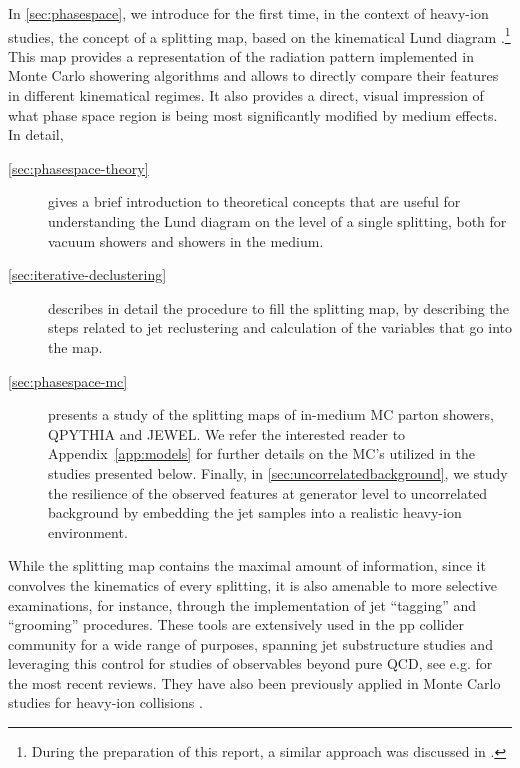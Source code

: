  In \autoref{sec:phasespace}, we introduce for the first time, in the context of heavy-ion studies, the concept of a splitting map, based on the kinematical Lund diagram \cite{Andersson:1988gp}.\footnote{During the preparation of this report, a similar approach was discussed in \cite{Chien:2018dfn}.}
 This map provides a representation of the radiation pattern implemented in Monte Carlo showering algorithms and allows to directly compare their features in different kinematical regimes. It also provides a direct, visual impression of what phase space region is being most significantly modified by medium effects. In detail, 
\begin{description}

\item[\autoref{sec:phasespace-theory}] gives a brief introduction to theoretical concepts that are useful for understanding the Lund diagram on the level of a single splitting, both for vacuum showers and showers in the medium.

\item[\autoref{sec:iterative-declustering}] describes in detail the procedure to fill the splitting map, by describing the steps related to jet reclustering and calculation of the variables that go into the map. 

\item[\autoref{sec:phasespace-mc}] presents a study of the splitting maps of in-medium MC parton showers, QPYTHIA and JEWEL. 
We refer the interested reader to Appendix~\ref{app:models} for further details on the MC's utilized in the studies presented below. 
Finally, in \autoref{sec:uncorrelatedbackground}, we study the resilience of the observed   features at generator level to uncorrelated background by embedding the jet samples into a realistic heavy-ion environment.

\end{description}
While the splitting map contains the maximal amount of information, since it convolves the kinematics of every splitting, it is also amenable to more selective examinations, for instance, through the implementation of jet ``tagging'' and ``grooming'' procedures. These tools are extensively used in the pp collider community \cite{Bendavid:2018nar} for a wide range of purposes, spanning jet substructure studies and leveraging this control for studies of observables beyond pure QCD, see e.g. \cite{Larkoski:2017jix,Asquith:2018igt} for the most recent reviews. They have also been previously applied in Monte Carlo studies for heavy-ion collisions \cite{Zhang:2015trf,Apolinario:2017qay,Milhano:2017nzm}. 

